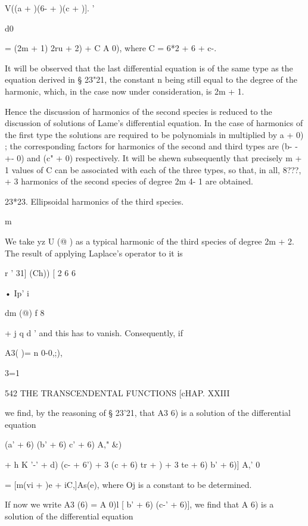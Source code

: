 {V((a + )(6- + )(c + )]. '



d0

= (2m + 1) 2ru + 2) + C A 0), where C = 6*2 + 6 + c-.

It will be observed that the last differential equation is of the same
type as the equation derived in § 23"21, the constant n being still
equal to the degree of the harmonic, which, in the case now under
consideration, is 2m + 1.

Hence the discussion of harmonics of the second species is reduced to
the discussion of solutions of Lame's differential equation. In the
case of harmonics of the first type the solutions are required to be
polynomials in multiplied by \/ a + 0) ; the corresponding factors for
harmonics of the second and third types are \/(b- -+- 0) and (c" + 0)
respectively. It will be shewn subsequently that precisely m + 1
values of C can be associated with each of the three types, so that,
in all, 8???, + 3 harmonics of the second species of degree 2m 4- 1
are obtained.

23*23. Ellipsoidal harmonics of the third species.

m

We take yz U (@ ) as a typical harmonic of the third species of degree
2m + 2. The result of applying Laplace's operator to it is

r ' 31] (Ch)) [ 2 6 6

• Ip' i %

  dm (@) f 8 %

+ j q d%
' and this has to vanish. Consequently, if



A3( )= n 0-0,;),

3=1



542 THE TRANSCENDENTAL FUNCTIONS [cHAP. XXIII

we find, by the reasoning of § 23'21, that A3 6) is a solution of the
differential equation

(a' + 6) (b' + 6) c' + 6) A," \&)

+ h K '-' + d) (c- + 6') + 3 (c + 6) tr + ) + 3 te + 6) b' + 6)] A,' 0

= [m(vi + )e + iC,]As(e), where Oj is a constant to be determined.

If now we write A3 (6) = A 0)l [ b' + 6) (c-' + 6)], we find that A 6)
is a solution of the differential equation



}
